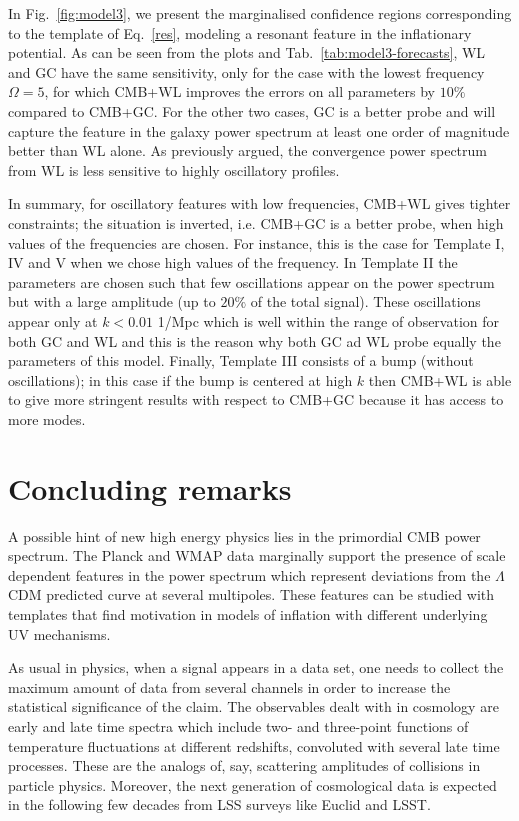 \documentclass[12pt]{article}
\begin{document}
In Fig.~\ref{fig:model3}, we present the marginalised confidence regions corresponding to the template of Eq.~\eqref{res}, modeling a resonant feature in the inflationary potential. As can be seen from the plots and Tab.~\ref{tab:model3-forecasts}, WL and GC have the same sensitivity, only for the case with the lowest frequency $\Omega=5$, for which CMB+WL improves the errors on all parameters by $10\%$ compared to CMB+GC. For the other two cases, GC is a better probe and will capture the feature in the galaxy power spectrum  at least one order of magnitude better than WL alone. As previously argued, the convergence power spectrum from WL is less sensitive to highly oscillatory profiles.  
%
%

In summary, for oscillatory features with low frequencies, CMB+WL gives tighter constraints; the situation is inverted, i.e. CMB+GC is a better probe, when high values of the frequencies are chosen. For instance, this is the case for Template I, IV and V when we chose high values of the frequency. In Template II the parameters are chosen such that few oscillations appear on the power spectrum but with a large amplitude (up to $20\%$ of the total signal). These oscillations appear only at $k<0.01$ 1/Mpc which is well within the range of observation for both GC and WL and this is the reason why both GC ad WL probe equally the parameters of this model. Finally, Template III consists of a bump (without oscillations); in this case if the bump is centered at high $k$ then CMB+WL is able to give more stringent results with respect to CMB+GC because it has access to more modes. 


\setcounter{equation}{0} 
\section{Concluding remarks} \label{s5:conclusions}



A possible hint of new high energy physics lies in the primordial CMB power spectrum. The Planck and WMAP data marginally support the presence of scale dependent features in the power spectrum which represent deviations from the $\Lambda$CDM predicted curve at several multipoles.  These features can be studied with templates that find motivation in models of inflation with different underlying UV mechanisms.

As usual in physics, when a signal appears in a data set, one needs to collect the maximum amount of data from several channels in order to increase the statistical significance of the claim. The observables dealt with in cosmology are early and late time spectra which include two- and three-point functions of temperature fluctuations at different redshifts, convoluted with several late time processes. These are the analogs of, say, scattering amplitudes of collisions in particle physics.
Moreover, the next generation of cosmological data is expected in the following few decades from LSS surveys like Euclid and LSST. 
\end{document}

